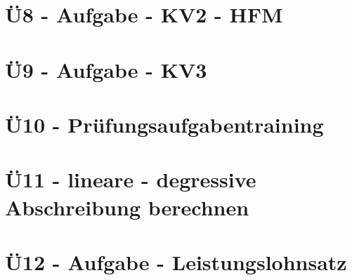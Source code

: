 \section{Ü8 - Aufgabe - KV2 - HFM}\label{sec:U08-Aufgabe-KV2-HFM}



\section{Ü9 - Aufgabe - KV3}\label{sec:U09-Aufgabe-KV3}



\section{Ü10 - Prüfungsaufgabentraining}\label{sec:U10-Pruefungsaufgabentraining}


 \newpage

\section{Ü11 - lineare - degressive Abschreibung berechnen}
 \newpage

\section{Ü12 - Aufgabe - Leistungslohnsatz}\label{sec:U12-Aufgabe-Leistungslohnsatz}

 \newpage


